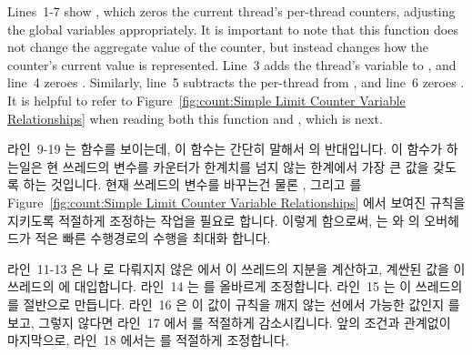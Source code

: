 Lines~1-7 show , which zeros the current thread's
per-thread counters, adjusting the global variables appropriately.
It is important to note that this function does not change the aggregate
value of the counter, but instead changes how the counter's current value
is represented.
Line~3 adds the thread's  variable to ,
and line~4 zeroes .
Similarly, line~5 subtracts the per-thread  from
, and line~6 zeroes .
It is helpful to refer to
Figure~\ref{fig:count:Simple Limit Counter Variable Relationships}
when reading both this function and , which is next.
\fi

라인~9-19 는  함수를 보이는데, 이 함수는 간단히 말해서
 의 반대입니다.
이 함수가 하는일은 현 쓰레드의  변수를 카운터가
 한계치를 넘지 않는 한계에서 가장 큰 값을 갖도록 하는
것입니다.
현재 쓰레드의  변수를 바꾸는건 물론 ,
 그리고  를 
Figure~\ref{fig:count:Simple Limit Counter Variable Relationships} 에서 보여진
규칙을 지키도록 적절하게 조정하는 작업을 필요로 합니다.
이렇게 함으로써,  는  와 
의 오버헤드가 적은 빠른 수행경로의 수행을 최대화 합니다.

라인~11-13 은  나  로 다뤄지지 않은
 에서 이 쓰레드의 지분을 계산하고, 계싼된 값을 이 쓰레드의
 에 대입합니다.
라인~14 는  를 올바르게 조정합니다.
라인~15 는 이 쓰레드의  를  절반으로 만듭니다.
라인~16 은 이  값이 규칙을 깨지 않는 선에서 가능한 값인지
 를 보고, 그렇지 않다면 라인~17 에서  를 적절하게
감소시킵니다.
앞의 조건과 관계없이 마지막으로, 라인~18 에서는  를 적절하게
조정합니다.
\iffalse

